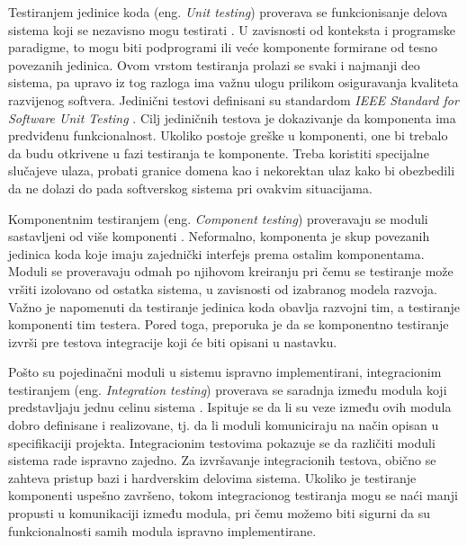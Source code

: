 \documentclass[12pt,oneside]{memoir}
\begin{document}
Testiranjem jedinice koda (eng. \textit{Unit testing}) proverava se funkcionisanje delova sistema koji se nezavisno mogu testirati \cite{SoftwareUnitTesting}. U zavisnosti od konteksta i programske paradigme, to mogu biti podprogrami ili veće komponente formirane od tesno povezanih jedinica. Ovom vrstom testiranja prolazi se svaki i najmanji deo sistema, pa upravo iz tog razloga ima važnu ulogu prilikom osiguravanja kvaliteta razvijenog softvera. Jedinični testovi definisani su standardom \textit{IEEE Standard for Software Unit Testing} \cite{IEEEStandard}. Cilj jediničnih testova je dokazivanje da komponenta ima predviđenu funkcionalnost. Ukoliko postoje greške u komponenti, one bi trebalo da budu otkrivene u fazi testiranja te komponente. Treba koristiti specijalne slučajeve ulaza, probati granice domena kao i nekorektan ulaz kako bi obezbedili da ne dolazi do pada softverskog sistema pri ovakvim situacijama.
\par
Komponentnim testiranjem (eng. \textit{Component testing}) proveravaju se moduli sastavljeni od više komponenti \cite{ComponentTesting}. Neformalno, komponenta je skup povezanih jedinica koda koje imaju zajednički interfejs prema ostalim komponentama.  Moduli se proveravaju odmah po njihovom kreiranju pri čemu se testiranje može vršiti izolovano od ostatka sistema, u zavisnosti od izabranog modela razvoja. Važno je napomenuti da testiranje jedinica koda obavlja razvojni tim, a testiranje komponenti tim testera. Pored toga, preporuka je da se komponentno testiranje izvrši pre testova integracije koji će biti opisani u nastavku.
\par

Pošto su pojedinačni moduli u sistemu ispravno implementirani, integracionim testiranjem (eng. \textit{Integration testing}) proverava se saradnja između modula koji predstavljaju jednu celinu sistema \cite{IntegrationTesting}. Ispituje se da li su veze između ovih modula dobro definisane i realizovane, tj. da li moduli komuniciraju na način opisan u specifikaciji projekta. 
Integracionim testovima pokazuje se da različiti moduli sistema rade ispravno zajedno. Za izvršavanje integracionih testova, obično se zahteva pristup bazi i hardverskim delovima sistema. Ukoliko je testiranje komponenti uspešno završeno, tokom integracionog testiranja mogu se naći manji propusti u komunikaciji između modula, pri čemu možemo biti sigurni da su funkcionalnosti samih modula ispravno implementirane.
\par
 
\end{document}
